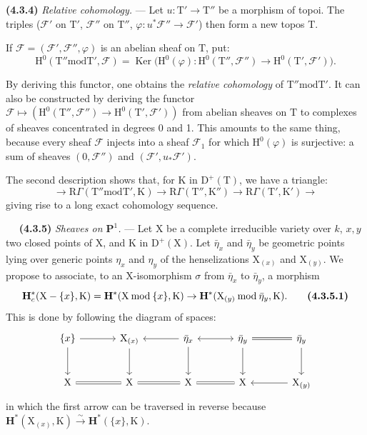 \documentclass[11pt,leqno]{article}
\newcommand{\Page}[1]{\ifvmode\noindent\else\unskip\ \fi{\footnotesize\textcolor{gray}{[p.\,#1]}}\ \ignorespaces}
\begin{document}
\textbf{(4.3.4)} \textit{Relative cohomology.} — Let \(u:\mathrm{T}'\to\mathrm{T}''\) be a morphism of topoi. The triples (\(\mathscr{F}'\) on \(\mathrm{T}'\), \(\mathscr{F}''\) on \(\mathrm{T}''\), \(\varphi:u^*\mathscr{F}''\to\mathscr{F}'\)) then form a new topos \(\mathrm{T}\).

If \(\mathscr{F}=(\mathscr{F}',\mathscr{F}'',\varphi)\) is an abelian sheaf on \(\mathrm{T}\), put:
\[
\mathrm{H}^0(\mathrm{T}''\mathbin{\mathrm{mod}}\mathrm{T}',\mathscr{F})
=
\operatorname{Ker}
\bigl(\mathrm{H}^0(\varphi):
\mathrm{H}^0(\mathrm{T}'',\mathscr{F}'')
\to\mathrm{H}^0(\mathrm{T}',\mathscr{F}')\bigr).
\]

By deriving this functor, one obtains the \textit{relative cohomology} of \(\mathrm{T}''\mathbin{\mathrm{mod}}\mathrm{T}'\). It can also be constructed by deriving the functor \(\mathscr{F}\mapsto(\mathrm{H}^0(\mathrm{T}'',\mathscr{F}'')\to\mathrm{H}^0(\mathrm{T}',\mathscr{F}'))\) from abelian sheaves on \(\mathrm{T}\) to complexes of sheaves concentrated in degrees 0 and 1. This amounts to the same thing, because every sheaf \(\mathscr{F}\) injects into a sheaf \(\mathscr{F}_1\) for which \(\mathrm{H}^0(\varphi)\) is surjective: a sum of sheaves \((0,\mathscr{F}'')\) and \((\mathscr{F}',u_*\mathscr{F}')\).

The second description shows that, for \(\mathrm{K}\) in \(\mathrm{D}^+(\mathrm{T})\), we have a triangle:
\[
\to\mathrm{R}\Gamma(\mathrm{T}''\mathbin{\mathrm{mod}}\mathrm{T}',\mathrm{K})
\to\mathrm{R}\Gamma(\mathrm{T}'',\mathrm{K}'')
\to\mathrm{R}\Gamma(\mathrm{T}',\mathrm{K}')
\to
\]
giving rise to a long exact cohomology sequence.

\Page{224}
\textbf{(4.3.5)} \textit{Sheaves on \(\mathbf{P}^1\).} — Let \(\mathrm{X}\) be a complete irreducible variety over \(k\), \(x,y\) two closed points of \(\mathrm{X}\), and \(\mathrm{K}\) in \(\mathrm{D}^+(\mathrm{X})\). Let \(\bar\eta_x\) and \(\bar\eta_y\) be geometric points lying over generic points \(\eta_x\) and \(\eta_y\) of the henselizations \(\mathrm{X}_{(x)}\) and \(\mathrm{X}_{(y)}\). We propose to associate, to an \(\mathrm{X}\)-isomorphism \(\sigma\) from \(\bar\eta_x\) to \(\bar\eta_y\), a morphism
\[
\mathbf{H}_c^*(\mathrm{X}-\{x\},\mathrm{K})
=
\mathbf{H}^*(\mathrm{X}\mathbin{\mathrm{mod}}\{x\},\mathrm{K})
\to
\mathbf{H}^*(\mathrm{X}_{(y)}\mathbin{\mathrm{mod}}\bar\eta_y,\mathrm{K}).
\tag*{\textbf{(4.3.5.1)}}
\]
This is done by following the diagram of spaces:
\[
\begin{tikzcd}[column sep=large,row sep=large]
\{x\} \arrow[r] \arrow[d]
  & \mathrm{X}_{(x)} \arrow[d]
  & \bar\eta_x \arrow[l] \arrow[r,leftrightarrow] \arrow[d]
  & \bar\eta_y \arrow[r,equal] \arrow[d]
  & \bar\eta_y \arrow[d] \\
\mathrm{X} \arrow[r,equal]
  & \mathrm{X} \arrow[r,equal]
  & \mathrm{X} \arrow[r,equal]
  & \mathrm{X} \arrow[r,leftarrow]
  & \mathrm{X}_{(y)}
\end{tikzcd}
\]
in which the first arrow can be traversed in reverse because \(\mathbf{H}^*(\mathrm{X}_{(x)},\mathrm{K})\xrightarrow{\sim}\mathbf{H}^*(\{x\},\mathrm{K})\).
\end{document}
